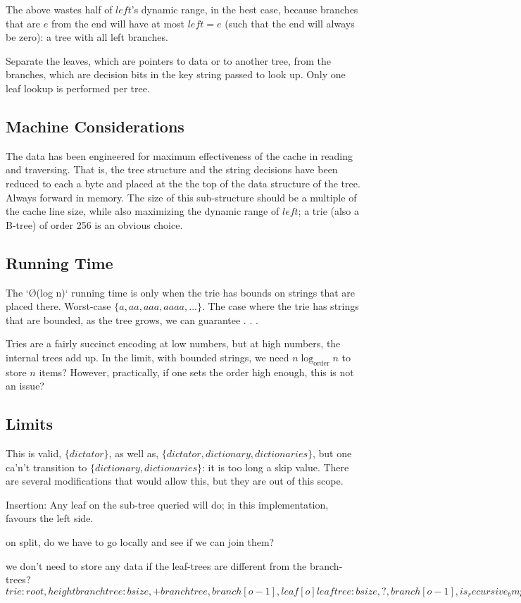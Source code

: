 \documentclass[12pt]{article}
\begin{document}
The above wastes half of $\mathit{left}$'s dynamic range, in the best case, because branches that are $e$ from the end will have at most $\mathit{left} = e$ (such that the end will always be zero): a tree with all left branches.

 Separate the leaves, which are pointers to data or to another tree, from the branches, which are decision bits in the key string passed to look up. Only one leaf lookup is performed per tree.

\subsection{Machine Considerations}

The data has been engineered for maximum effectiveness of the cache in reading and traversing. That is, the tree structure and the string decisions have been reduced to each a byte and placed at the the top of the data structure of the tree. Always forward in memory. The size of this sub-structure should be a multiple of the cache line size, while also maximizing the dynamic range of $\mathit{left}$; a trie (also a B-tree) of order 256 is an obvious choice.\cite{sinha2004cache}

\subsection{Running Time}

The `\O(log n)` running time is only when the trie has bounds on strings that are placed there. Worst-case $\{ a, aa, aaa, aaaa, ... \}$. The case where the trie has strings that are bounded, as the tree grows, we can guarantee . . .

Tries are a fairly succinct encoding at low numbers, but at high numbers, the internal trees add up. In the limit, with bounded strings, we need $n \log_{\text{order}} n$ to store $n$ items? However, practically, if one sets the order high enough, this is not an issue?

\subsection{Limits}

This is valid, $\{ dictator \}$, as well as, $\{ dictator, dictionary, dictionaries \}$, but one ca'n't transition to $\{ dictionary, dictionaries \}$: it is too long a skip value. There are several modifications that would allow this, but they are out of this scope.

Insertion: Any leaf on the sub-tree queried will do; in this implementation, favours the left side.

on split, do we have to go locally and see if we can join them?

we don't need to store any data if the leaf-trees are different from the branch-trees?
$
trie: root, height
branch tree: bsize, +branchtree, branch[o-1], leaf[o]
leaf tree: bsize, ?, branch[o-1], is_recursive_bmp[o/8], leaf[o]
or
leaf tree: bsize, ?, branch[o-1], leaf[o] { skip, union{ data, trie } }
or
leaf tree: bsize, ?, branch[o-1], leaf[o] { 32:skip, 32:height, 64:root / 64:data }
$


\end{document}
